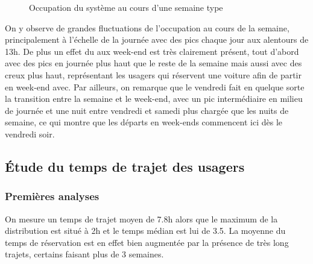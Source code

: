 \documentclass[12pt,a4paper]{article}
\theoremstyle{definition}
\begin{document}
{\begin{figure}[!h]
\label{semaine_type}
\centering
{}
\caption{Occupation du système au cours d'une semaine type}
\label{blocking_proba_plot}
\end{figure}

On y observe de grandes fluctuations de l'occupation au cours de la semaine, principalement à l'échelle de la journée avec des pics chaque jour aux alentours de 13h. De plus un effet du aux week-end est très clairement présent, tout d'abord avec des pics en journée plus haut que le reste de la semaine mais aussi avec des creux plus haut, représentant les usagers qui réservent une voiture afin de partir en week-end avec. Par ailleurs, on remarque que le vendredi fait en quelque sorte la transition entre la semaine et le week-end, avec un pic intermédiaire en milieu de journée et une nuit entre vendredi et samedi plus chargée que les nuits de semaine, ce qui montre que les départs en week-ends commencent ici dès le vendredi soir.






\subsection{Étude du temps de trajet des usagers}


\subsubsection{Premières analyses}

On mesure un temps de trajet moyen de 7.8h alors que le maximum de la distribution est situé à 2h et le temps médian est lui de 3.5. La moyenne du temps de réservation est en effet bien augmentée par la présence de très long trajets, certains faisant plus de 3 semaines.

}
\end{document}
